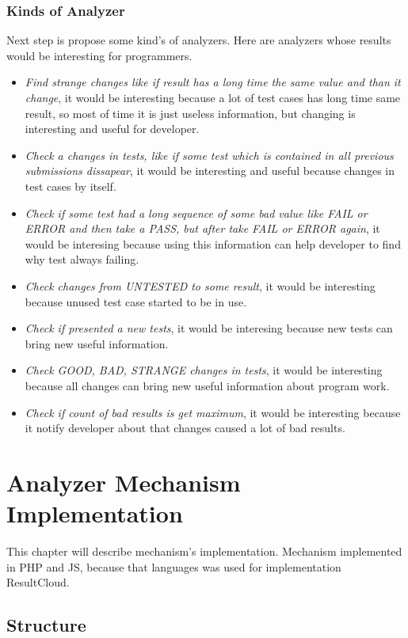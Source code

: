 \subsection{Kinds of Analyzer}

Next step is propose some kind's of analyzers. Here are analyzers whose results would be interesting for programmers.
\begin{itemize} 
\item \emph{Find strange changes like if result has a long time the same value and than it change}, it would be interesting because a lot of test cases has long time same result, so most of time it is just useless information, but changing is interesting and useful for developer.
\item \emph{Check a changes in tests, like if some test which is contained in all previous submissions dissapear}, it would be interesting and useful because changes in test cases by itself.
\item \emph{Check if some test had a long sequence of some bad value like FAIL or ERROR and then take a PASS, but after take FAIL or ERROR again}, it would be interesing because using this information can help developer to find why test always failing.
\item \emph{Check changes from UNTESTED to some result}, it would be interesting because unused test case started to be in use.
\item \emph{Check if presented a new tests}, it would be interesing because new tests can bring new useful information.
\item \emph{Check GOOD, BAD, STRANGE changes in tests}, it would be interesting because all changes can bring new useful information about program work. 
\item \emph{Check if count of bad results is get maximum}, it would be interesting because it notify developer about that changes caused a lot of bad results.
\end{itemize}

\chapter{Analyzer Mechanism Implementation}
\label{ch:analyzer_implement}

This chapter will describe mechanism's implementation. Mechanism implemented in PHP and JS, because that languages was used for implementation ResultCloud.

\section{Structure}

